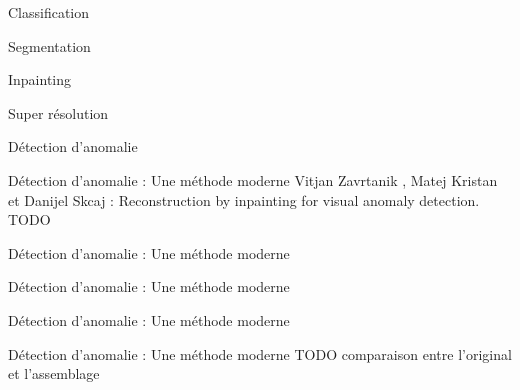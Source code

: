 \begin{frame}{Classification}
\end{frame}

\begin{frame}{Segmentation}
\end{frame}

\begin{frame}{Inpainting}
\end{frame}

\begin{frame}{Super résolution}
\end{frame}

\begin{frame}{Détection d'anomalie}
\end{frame}

\begin{frame}{Détection d'anomalie : Une méthode moderne}
    Vitjan Zavrtanik , Matej Kristan et Danijel Skcaj : Reconstruction by inpainting for visual anomaly detection.
    \alert{TODO}
\end{frame}

\begin{frame}{Détection d'anomalie : Une méthode moderne}
\end{frame}

\begin{frame}{Détection d'anomalie : Une méthode moderne}
\end{frame}

\begin{frame}{Détection d'anomalie : Une méthode moderne}
\end{frame}
  
\begin{frame}{Détection d'anomalie : Une méthode moderne}
    \alert{TODO}
    comparaison entre l'original et l'assemblage
\end{frame}

